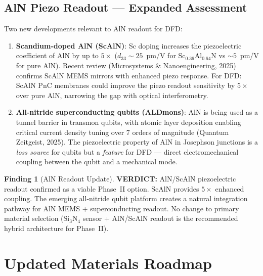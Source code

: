 \documentclass[11pt]{article}
\theoremstyle{definition}
\newtheorem{finding}[theorem]{Finding}
\theoremstyle{remark}
\newcommand{\verdict}[1]{\textcolor{green!50!black}{\textbf{VERDICT:} #1}}
\begin{document}
\subsection{AlN Piezo Readout --- Expanded Assessment}
\label{sec:aln_update}

Two new developments relevant to AlN readout for DFD:

\begin{enumerate}[nosep]
\item \textbf{Scandium-doped AlN (ScAlN)}: Sc doping increases the
  piezoelectric coefficient of AlN by up to $5\times$
  ($d_{33} \sim 25$~pm/V for Sc$_{0.36}$Al$_{0.64}$N vs
  $\sim 5$~pm/V for pure AlN). Recent review (Microsystems \&
  Nanoengineering, 2025) confirms ScAlN MEMS mirrors with enhanced
  piezo response. For DFD: ScAlN PnC membranes could improve the
  piezo readout sensitivity by $5\times$ over pure AlN, narrowing
  the gap with optical interferometry.

\item \textbf{All-nitride superconducting qubits (ALDmons)}: AlN
  is being used as a tunnel barrier in transmon qubits, with atomic
  layer deposition enabling critical current density tuning over 7
  orders of magnitude (Quantum Zeitgeist, 2025). The piezoelectric
  property of AlN in Josephson junctions is a \textit{loss source}
  for qubits but a \textit{feature} for DFD --- direct electromechanical
  coupling between the qubit and a mechanical mode.
\end{enumerate}

\begin{finding}[AlN Readout Update]
\label{find:aln_update}
\verdict{AlN/ScAlN piezoelectric readout confirmed as a viable
Phase~II option. ScAlN provides $5\times$ enhanced coupling. The
emerging all-nitride qubit platform creates a natural integration
pathway for AlN MEMS + superconducting readout. No change to primary
material selection (Si$_3$N$_4$ sensor + AlN/ScAlN readout is the
recommended hybrid architecture for Phase~II).}
\end{finding}


\section{Updated Materials Roadmap}
\label{sec:roadmap}
\end{document}
